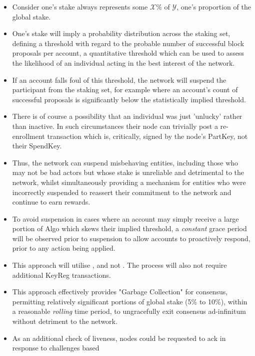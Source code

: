 \documentclass[11pt,a4paper]{article}
\begin{document}
\begin{itemize}
    \item Consider one's stake always represents some $\mathcal{X}\%$ of $\mathcal{Y}$, one's proportion of the global 
          stake.
    \item One's stake will imply a probability distribution across the staking set, defining a threshold with regard to 
          the probable number of successful block proposals per account, a quantitative threshold which can be used to 
          assess the likelihood of an individual acting in the best interest of the network.
    \item If an account falls foul of this threshold, the network will suspend the participant from the staking
          set, for example where an account's count of successful proposals is significantly below the statistically 
          implied threshold.
    \item There is of course a possibility that an individual was just 'unlucky' rather than inactive. In such 
          circumstances their node can trivially post a re-enrollment transaction which is, critically, signed by the 
          node's \gls{PartKey}, not their \gls{SpendKey}.
    \item Thus, the network can suspend misbehaving entities, including those who may not be bad actors but whose stake 
          is unreliable and detrimental to the network, whilst simultaneously providing a mechanism for entities who
          were incorrectly suspended to reassert their commitment to the network and continue to earn rewards.
    \item To avoid suspension in cases where an account may simply receive a large portion of Algo which skews their 
          implied threshold, a \emph{constant} grace period will be observed prior to suspension to allow accounts to 
          proactively respond, prior to any action being applied.
    \item This approach will utilise , and not . The process will
          also not require additional \gls{KeyReg} transactions.
    \item This approach effectively provides "Garbage Collection" for consensus, permitting relatively significant 
          portions of global stake (5\% to 10\%), within a reasonable \emph{rolling} time period, to ungracefully exit 
          consensus ad-infinitum without detriment to the network.
    \item As an additional check of liveness, nodes could be requested to ack in response to challenges based 

\end{itemize}
\end{document}
